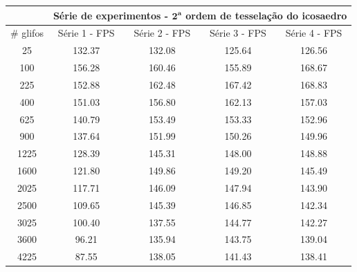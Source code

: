 \documentclass[
    12pt,                %
    oneside,            %
    a4paper,            %
    english,            %
    french,                %
    spanish,            %
    brazil                %
    ]{abntex2}
\begin{document}
\begin{apendicesenv}
\begin{table}[htb]
\begin{tabular}{c|c|c|c|c|}
\cline{2-5}
\textbf{}                       & \multicolumn{4}{c|}{\textbf{Série de experimentos - $\mathbf{2^a}$ ordem de tesselação do icosaedro}} \\ \hline
\multicolumn{1}{|c|}{\# glifos} & Série 1 - FPS       & Série 2 - FPS  & Série 3 - FPS         & Série 4 - FPS       \\ \hline
\multicolumn{1}{|c|}{25}        & 132.37              & 132.08         & 125.64                & 126.56              \\ \hline
\multicolumn{1}{|c|}{100}       & 156.28              & 160.46         & 155.89                & 168.67              \\ \hline
\multicolumn{1}{|c|}{225}       & 152.88              & 162.48         & 167.42                & 168.83              \\ \hline
\multicolumn{1}{|c|}{400}       & 151.03              & 156.80         & 162.13                & 157.03              \\ \hline
\multicolumn{1}{|c|}{625}       & 140.79              & 153.49         & 153.33                & 152.96              \\ \hline
\multicolumn{1}{|c|}{900}       & 137.64              & 151.99         & 150.26                & 149.96              \\ \hline
\multicolumn{1}{|c|}{1225}      & 128.39              & 145.31         & 148.00                & 148.88              \\ \hline
\multicolumn{1}{|c|}{1600}      & 121.80              & 149.86         & 149.20                & 145.49              \\ \hline
\multicolumn{1}{|c|}{2025}      & 117.71              & 146.09         & 147.94                & 143.90              \\ \hline
\multicolumn{1}{|c|}{2500}      & 109.65              & 145.39         & 146.85                & 142.34              \\ \hline
\multicolumn{1}{|c|}{3025}      & 100.40              & 137.55         & 144.77                & 142.27              \\ \hline
\multicolumn{1}{|c|}{3600}      &  96.21              & 135.94         & 143.75                & 139.04              \\ \hline
\multicolumn{1}{|c|}{4225}      &  87.55              & 138.05         & 141.43                & 138.41              \\ \hline

\end{tabular}
\end{table}
\end{apendicesenv}
\end{document}
